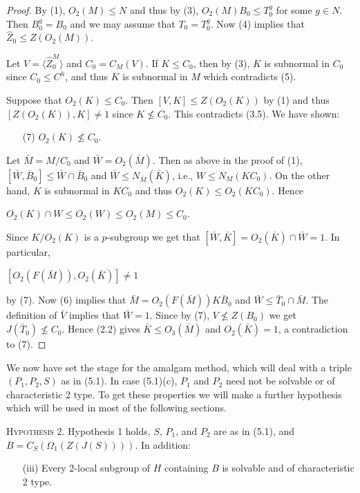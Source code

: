 \documentclass[11pt]{article}
\theoremstyle{plain}
\theoremstyle{stmplain}
\newcommand{\disp}[1]{\begin{center}$\displaystyle #1$\end{center}}
\begin{document}
\begin{proof}
\smallskip
\noindent By (1), $O_2(M) \le N$ and thus by (3), $O_2(M)B_0 \le T_0^g$ for some $g
\in N$. Then $B_0^g = B_0$ and we may assume that $T_0 = T_0^g$. Now (4) implies
that $\hat{Z}_0 \le Z(O_2(M))$.

\noindent Let $V = \langle \hat{Z}_0^M \rangle$ and $C_0 = C_M(V)$. If $K \le C_0$,
then by (3), $K$ is subnormal in $C_0$ since $C_0 \le C^h$, and thus $K$ is
subnormal in $M$ which contradicts (5).

\smallskip
\noindent Suppose that $O_2(K) \le C_0$. Then $[V, K] \le Z(O_2(K))$ by (1) and thus
$[Z(O_2(K)), K] \ne 1$ since $K \nleq C_0$. This contradicts (3.5). We have
shown:
\begin{enumerate}
\item[(7)] $O_2(K) \nleq C_0$.
\end{enumerate}

\smallskip
\noindent Let $\bar{M} = M/C_0$ and $\bar{W} = O_2(\bar{M})$. Then as above in the
proof of (1), $[\bar{W}, \bar{B}_0] \le \bar{W} \cap \bar{B}_0$ and $\bar{W} \le
N_{\bar{M}}(\bar{K})$, i.e., $W \le N_M(KC_0)$. On the other hand, $K$ is
subnormal in $KC_0$ and thus $O_2(K) \le O_2(KC_0)$. Hence
\disp{O_2(K) \cap W \le O_2(W) \le O_2(M) \le C_0.}
Since $K/O_2(K)$ is a $p$-subgroup we get that $[\bar{W}, \bar{K}] = O_2(\bar{K})
\cap \bar{W} = 1$. In particular,
\disp{[O_2(F(\bar{M})), O_2(\bar{K})] \ne 1}
by (7). Now (6) implies that $\bar{M} = O_2(F(\bar{M}))K\bar{B}_0$ and $\bar{W} \le
\bar{T}_0 \cap \bar{M}$. The definition of $\bar{V}$ implies that $\bar{W} =
1$. Since by (7), $V \nleq Z(B_0)$ we get $J(\bar{T}_0) \nleq C_0$. Hence
(2.2) gives $\bar{K} \le O_3(\bar{M})$ and $O_2(\bar{K}) = 1$, a contradiction
to (7).
\end{proof}

\smallskip
\noindent We now have set the stage for the amalgam method, which will deal with
a triple $(P_1, P_2, S)$ as in (5.1). In case (5.1)(c), $P_1$ and $P_2$ need
not be solvable or of characteristic 2 type. To get these properties we will
make a further hypothesis which will be used in most of the following sections.

\medskip
\noindent\textsc{Hypothesis 2.} \quad Hypothesis 1 holds, $S$, $P_1$, and $P_2$ are as in
(5.1), and $B = C_S(\Omega_1(Z(J(S))))$. In addition:
\begin{enumerate}
\item[(iii)] Every 2-local subgroup of $H$ containing $B$ is solvable and of
  characteristic 2 type.
\end{enumerate}
\end{document}
